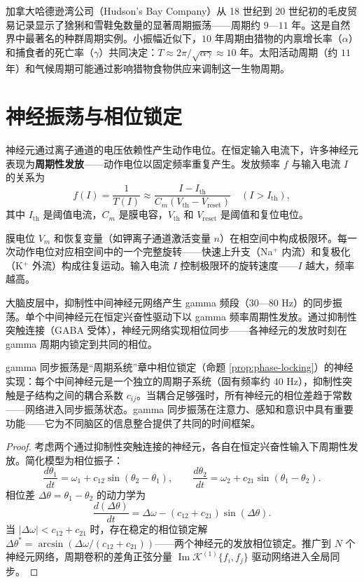 \begin{example}[加拿大猞猁与雪鞋兔的十年周期]
加拿大哈德逊湾公司（Hudson's Bay Company）从 18 世纪到 20 世纪初的毛皮贸易记录显示了猞猁和雪鞋兔数量的显著周期振荡——周期约 $9$—$11$ 年。这是自然界中最著名的种群周期实例。小振幅近似下，$10$ 年周期由猎物的内禀增长率（$\alpha$）和捕食者的死亡率（$\gamma$）共同决定：$T \approx 2\pi/\sqrt{\alpha\gamma} \approx 10$ 年。太阳活动周期（约 $11$ 年）和气候周期可能通过影响猎物食物供应来调制这一生物周期。
\end{example}

\section{神经振荡与相位锁定}

\begin{definition}[神经元动作电位的周期发放]\label{def:neural_oscillation}
神经元通过离子通道的电压依赖性产生动作电位。在恒定输入电流下，许多神经元表现为\textbf{周期性发放}——动作电位以固定频率重复产生。发放频率 $f$ 与输入电流 $I$ 的关系为
\[
f(I) = \frac{1}{T(I)} \approx \frac{I - I_{\text{th}}}{C_m (V_{\text{th}} - V_{\text{reset}})} \quad (I > I_{\text{th}}),
\]
其中 $I_{\text{th}}$ 是阈值电流，$C_m$ 是膜电容，$V_{\text{th}}$ 和 $V_{\text{reset}}$ 是阈值和复位电位。

膜电位 $V_m$ 和恢复变量（如钾离子通道激活变量 $n$）在相空间中构成极限环。每一次动作电位对应相空间中的一个完整旋转——快速上升支（Na$^+$ 内流）和复极化（K$^+$ 外流）构成往复运动。输入电流 $I$ 控制极限环的旋转速度——$I$ 越大，频率越高。
\end{definition}

\begin{proposition}\label{prop:gamma_oscillation}
大脑皮层中，抑制性中间神经元网络产生 gamma 频段（$30$—$80$ Hz）的同步振荡。单个中间神经元在恒定兴奋性驱动下以 gamma 频率周期性发放。通过抑制性突触连接（GABA 受体），神经元网络实现相位同步——各神经元的发放时刻在 gamma 周期内锁定到共同的相位。

gamma 同步振荡是“周期系统”章中相位锁定（命题 \ref{prop:phase-locking}）的神经实现：每个中间神经元是一个独立的周期子系统（固有频率约 $40$ Hz），抑制性突触是子结构之间的耦合系数 $c_{ij}$。当耦合足够强时，所有神经元的相位差趋于常数——网络进入同步振荡状态。gamma 同步振荡在注意力、感知和意识中具有重要功能——它为不同脑区的信息整合提供了共同的时间框架。
\end{proposition}

\begin{proof}
考虑两个通过抑制性突触连接的神经元，各自在恒定兴奋性输入下周期性发放。简化模型为相位振子：
\[
\frac{d\theta_1}{dt} = \omega_1 + c_{12} \sin(\theta_2 - \theta_1), \qquad \frac{d\theta_2}{dt} = \omega_2 + c_{21} \sin(\theta_1 - \theta_2).
\]
相位差 $\Delta\theta = \theta_1 - \theta_2$ 的动力学为
\[
\frac{d(\Delta\theta)}{dt} = \Delta\omega - (c_{12} + c_{21})\sin(\Delta\theta).
\]
当 $|\Delta\omega| < c_{12} + c_{21}$ 时，存在稳定的相位锁定解 $\Delta\theta^* = \arcsin(\Delta\omega/(c_{12} + c_{21}))$——两个神经元的发放相位锁定。推广到 $N$ 个神经元网络，周期卷积的差角正弦分量 $\operatorname{Im}\mathcal{K}^{(1)}\{f_i, f_j\}$ 驱动网络进入全局同步。
\end{proof}

